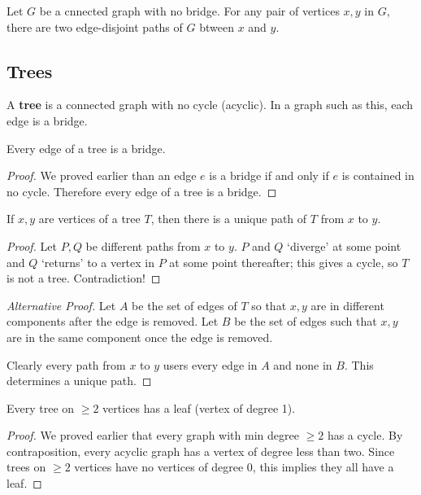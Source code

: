 \documentclass[12pt]{article}
\begin{document}
\begin{theorem}
Let $G$ be a cnnected graph with no bridge. For any pair of vertices $x,y$ in $G$, there are two edge-disjoint paths of $G$ btween $x$ and $y$.
\end{theorem}

\subsection{Trees}
A {\bf tree} is a connected graph with no cycle (acyclic). In a graph such as this, each edge is a bridge.

\begin{lemma}
Every edge of a tree is a bridge.
\end{lemma}

\begin{proof}
We proved earlier than an edge $e$ is a bridge if and only if $e$ is contained in no cycle. Therefore every edge of a tree is a bridge.
\end{proof}

\begin{lemma}
If $x,y$ are vertices of a tree $T$, then there is a unique path of $T$ from $x$ to $y$.
\end{lemma}

\begin{proof}
Let $P,Q$ be different paths from $x$ to $y$. $P$ and $Q$ `diverge' at some point and $Q$ `returns' to a vertex in $P$ at some point thereafter; this gives a cycle, so $T$ is not a tree. Contradiction!
\end{proof}

\begin{proof}[Alternative Proof]
Let $A$ be the set of edges of $T$ so that $x,y$ are in different components after the edge is removed. Let $B$ be the set of edges such that $x,y$ are in the same component once the edge is removed.

Clearly every path from $x$ to $y$ users every edge in $A$ and none in $B$. This determines a unique path.
\end{proof}

\begin{lemma}
Every tree on $\geq 2$ vertices has a leaf (vertex of degree 1).
\end{lemma}

\begin{proof}
We proved earlier that every graph with min degree $\geq 2$ has a cycle. By contraposition, every acyclic graph has a vertex of degree less than two. Since trees on $\geq 2$ vertices have no vertices of degree 0, this implies they all have a leaf.
\end{proof}
\end{document}
